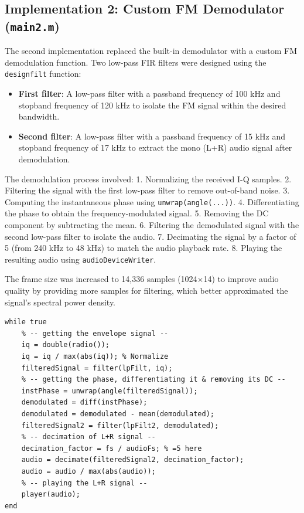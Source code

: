 \documentclass{article}
\begin{document}
\subsection*{Implementation 2: Custom FM Demodulator (\texttt{main2.m})}
The second implementation replaced the built-in demodulator with a custom FM demodulation function. Two low-pass FIR filters were designed using the \texttt{designfilt} function:
\begin{itemize}
    \item \textbf{First filter}: A low-pass filter with a passband frequency of 100 kHz and stopband frequency of 120 kHz to isolate the FM signal within the desired bandwidth.
    \item \textbf{Second filter}: A low-pass filter with a passband frequency of 15 kHz and stopband frequency of 17 kHz to extract the mono (L+R) audio signal after demodulation.
\end{itemize}
The demodulation process involved:
1. Normalizing the received I-Q samples.
2. Filtering the signal with the first low-pass filter to remove out-of-band noise.
3. Computing the instantaneous phase using \texttt{unwrap(angle(...))}.
4. Differentiating the phase to obtain the frequency-modulated signal.
5. Removing the DC component by subtracting the mean.
6. Filtering the demodulated signal with the second low-pass filter to isolate the audio.
7. Decimating the signal by a factor of 5 (from 240 kHz to 48 kHz) to match the audio playback rate.
8. Playing the resulting audio using \texttt{audioDeviceWriter}.

The frame size was increased to 14,336 samples (1024$\times$14) to improve audio quality by providing more samples for filtering, which better approximated the signal's spectral power density.

\begin{lstlisting}[caption={Main processing loop in \texttt{main2.m}},label={lst:main2}]
while true
    % -- getting the envelope signal --
    iq = double(radio());
    iq = iq / max(abs(iq)); % Normalize
    filteredSignal = filter(lpFilt, iq);
    % -- getting the phase, differentiating it & removing its DC --
    instPhase = unwrap(angle(filteredSignal));
    demodulated = diff(instPhase);
    demodulated = demodulated - mean(demodulated);
    filteredSignal2 = filter(lpFilt2, demodulated);
    % -- decimation of L+R signal --
    decimation_factor = fs / audioFs; % =5 here
    audio = decimate(filteredSignal2, decimation_factor);
    audio = audio / max(abs(audio));
    % -- playing the L+R signal --
    player(audio);
end
\end{lstlisting}
\end{document}

